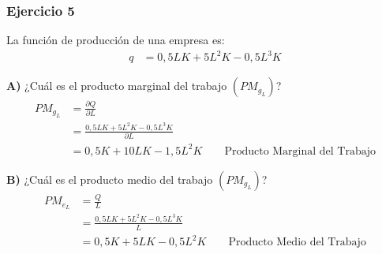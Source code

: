 \documentclass{templateNote}
\begin{document}
\newpage
\subsubsection{Ejercicio 5}

La función de producción de una empresa es:
\begin{align*}
    q &= 0,5 LK + 5 L^2K - 0,5 L^3K
\end{align*}

\subitem \textbf{A)}  ¿Cuál es el producto marginal del trabajo $(PM_{g_{L}})$?
\begin{align*}
    PM_{g_{L}} &= \frac{\partial Q}{\partial L} \\
    &= \frac{0,5 LK + 5 L^2K - 0,5 L^3K}{\partial L} \\
    &= 0,5K + 10LK - 1,5L^2K \qquad \text{Producto Marginal del Trabajo}
\end{align*}

\subitem \textbf{B)} ¿Cuál es el producto medio del trabajo $(PM_{g_{L}})$?
\begin{align*}
    PM_{e_{L}} &= \frac{Q}{L} \\
    &= \frac{0,5 LK + 5 L^2K - 0,5 L^3K}{L} \\
    &= 0,5K + 5LK - 0,5L^2K \qquad \text{Producto Medio del Trabajo}
\end{align*}
\end{document}
